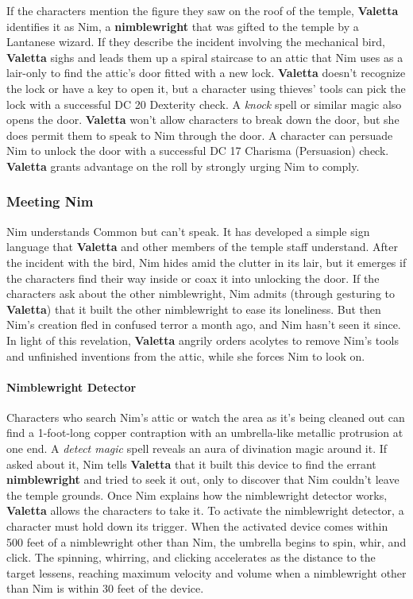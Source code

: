 \documentclass[10pt,a4paper,twoside,twocolumn,openany,nodeprecatedcode]{dndbook}
\begin{document}
If the characters mention the figure they saw on the roof of the temple, \textbf{Valetta} identifies it as Nim, a \textbf{nimblewright} that was gifted to the temple by a Lantanese wizard. If they describe the incident involving the mechanical bird, \textbf{Valetta} sighs and leads them up a spiral staircase to an attic that Nim uses as a lair-only to find the attic's door fitted with a new lock. \textbf{Valetta} doesn't recognize the lock or have a key to open it, but a character using thieves' tools can pick the lock with a successful DC 20 Dexterity check. A \textit{knock} spell or similar magic also opens the door. \textbf{Valetta} won't allow characters to break down the door, but she does permit them to speak to Nim through the door. A character can persuade Nim to unlock the door with a successful DC 17 Charisma (Persuasion) check. \textbf{Valetta} grants advantage on the roll by strongly urging Nim to comply.
\subsubsection{Meeting Nim}
Nim understands Common but can't speak. It has developed a simple sign language that \textbf{Valetta} and other members of the temple staff understand. After the incident with the bird, Nim hides amid the clutter in its lair, but it emerges if the characters find their way inside or coax it into unlocking the door. If the characters ask about the other nimblewright, Nim admits (through gesturing to \textbf{Valetta}) that it built the other nimblewright to ease its loneliness. But then Nim's creation fled in confused terror a month ago, and Nim hasn't seen it since. In light of this revelation, \textbf{Valetta} angrily orders acolytes to remove Nim's tools and unfinished inventions from the attic, while she forces Nim to look on.
\paragraph{Nimblewright Detector}
Characters who search Nim's attic or watch the area as it's being cleaned out can find a 1-foot-long copper contraption with an umbrella-like metallic protrusion at one end. A \textit{detect magic} spell reveals an aura of divination magic around it. If asked about it, Nim tells \textbf{Valetta} that it built this device to find the errant \textbf{nimblewright} and tried to seek it out, only to discover that Nim couldn't leave the temple grounds. Once Nim explains how the nimblewright detector works, \textbf{Valetta} allows the characters to take it. To activate the nimblewright detector, a character must hold down its trigger. When the activated device comes within 500 feet of a nimblewright other than Nim, the umbrella begins to spin, whir, and click. The spinning, whirring, and clicking accelerates as the distance to the target lessens, reaching maximum velocity and volume when a nimblewright other than Nim is within 30 feet of the device.
\end{document}
